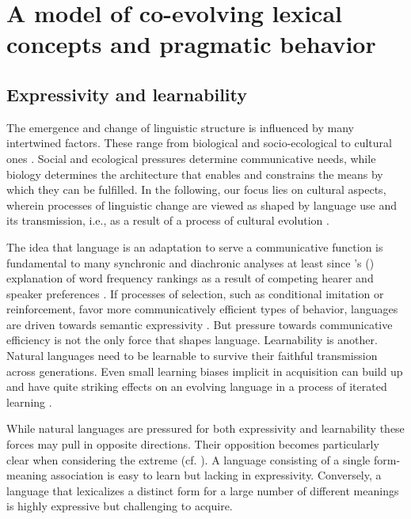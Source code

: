 \documentclass[a4paper, 11pt]{article}
\theoremstyle{Satz}
\newcommand{\citeposs}[2][]{\citeauthor{#2}'s (\citeyear[#1]{#2})}
\begin{document}
\section{A model of co-evolving lexical concepts and pragmatic behavior}
\label{sec:model}

\subsection{Expressivity and learnability}

The emergence and change of linguistic structure is influenced by many intertwined
factors. These range from biological and socio-ecological to cultural ones \citep{benz+etal:2005b,steels:2011,tamariz+kirby:2016}. Social and ecological pressures determine communicative needs, while
biology determines the architecture that enables and constrains the means by which they can be
fulfilled. In the following, our focus lies on cultural aspects, wherein processes of
linguistic change are viewed as shaped by language use and its transmission, i.e., as a result
of a process of cultural evolution
\citep{Pagel2009:Human-Language-,ThompsonKirby2016:Culture-Shapes-}.

The idea that language is an adaptation to serve a communicative function is fundamental to
many synchronic and diachronic analyses at least since \citeposs{zipf:1949} explanation of word
frequency rankings as a result of competing hearer and speaker preferences \citep[e.g.,
in][]{martinet:1962, horn:1984,jaeger+vRooij:2007,jaeger:2007,
  piantadosi:2014,kirby+etal:2015}. If processes of selection, such as conditional imitation or
reinforcement, favor more communicatively efficient types of behavior, languages are driven
towards semantic expressivity \citep[e.g.,][]{nowak+krakauer:1999,Skyrms2010:Signals}. But
pressure towards communicative efficiency is not the only force that shapes
language. Learnability is another. Natural languages need to be learnable to survive their
faithful transmission across generations. Even small learning biases implicit in acquisition
can build up and have quite striking effects on an evolving language in a process of iterated
learning
\citep{KirbyHurford2002:The-Emergence-o,SmithKirby2003:Iterated-Learni,kirby+etal:2014}.

While natural languages are pressured for both expressivity and learnability these forces may
pull in opposite directions. Their opposition becomes particularly clear when considering the
extreme (cf. \citealt{kemp+regier:2012,kirby+etal:2015}). A language consisting of a single
form-meaning association is easy to learn but lacking in expressivity. Conversely, a language
that lexicalizes a distinct form for a large number of different meanings is highly expressive
but challenging to acquire.
\end{document}
